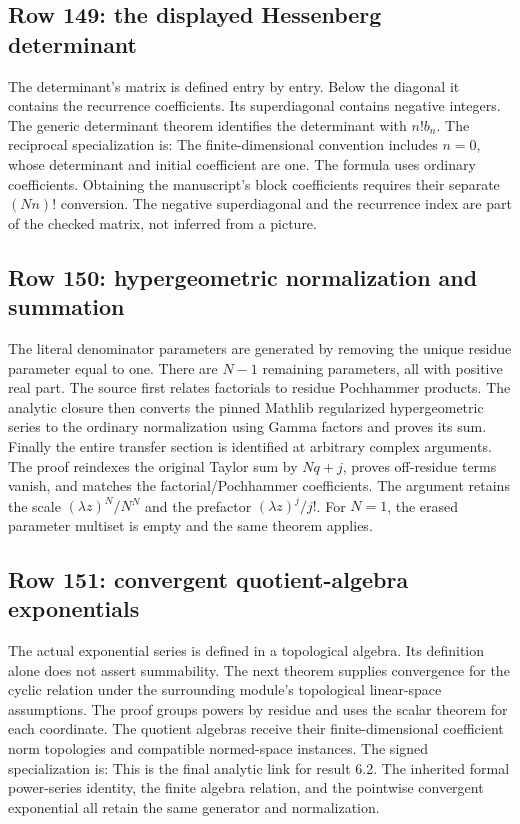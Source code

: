 \subsection{Row 149: the displayed Hessenberg determinant}
The determinant's matrix is defined entry by entry. Below the diagonal it contains the recurrence coefficients. Its superdiagonal contains negative integers.
The generic determinant theorem identifies the determinant with $n!b_n$. The reciprocal specialization is:
The finite-dimensional convention includes $n=0$, whose determinant and initial coefficient are one. The formula uses ordinary coefficients. Obtaining the manuscript's block coefficients requires their separate $(Nn)!$ conversion. The negative superdiagonal and the recurrence index are part of the checked matrix, not inferred from a picture.

\subsection{Row 150: hypergeometric normalization and summation}
The literal denominator parameters are generated by removing the unique residue parameter equal to one.
There are $N-1$ remaining parameters, all with positive real part. The source first relates factorials to residue Pochhammer products. The analytic closure then converts the pinned Mathlib regularized hypergeometric series to the ordinary normalization using Gamma factors and proves its sum.
Finally the entire transfer section is identified at arbitrary complex arguments.
The proof reindexes the original Taylor sum by $Nq+j$, proves off-residue terms vanish, and matches the factorial/Pochhammer coefficients. The argument retains the scale $(\lambda z)^N/N^N$ and the prefactor $(\lambda z)^j/j!$. For $N=1$, the erased parameter multiset is empty and the same theorem applies.

\subsection{Row 151: convergent quotient-algebra exponentials}
The actual exponential series is defined in a topological algebra.
Its definition alone does not assert summability. The next theorem supplies convergence for the cyclic relation under the surrounding module's topological linear-space assumptions.
The proof groups powers by residue and uses the scalar  theorem for each coordinate. The quotient algebras receive their finite-dimensional coefficient norm topologies and compatible normed-space instances. The signed specialization is:
This is the final analytic link for result 6.2. The inherited formal power-series identity, the finite algebra relation, and the pointwise convergent exponential all retain the same generator and normalization.
